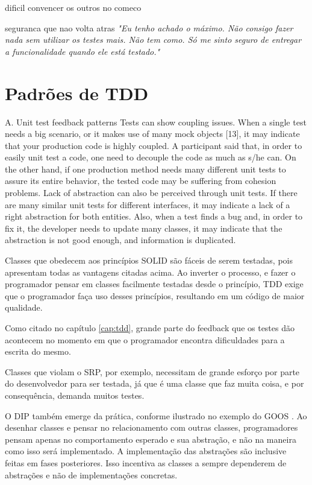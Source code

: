 dificil convencer os outros no comeco

seguranca que nao volta atras
\textit{"Eu tenho achado o máximo. Não consigo fazer nada sem utilizar os testes mais. Não tem como.
Só me sinto seguro de entregar a funcionalidade quando ele está testado."}

\section{Padrões de TDD}
A. Unit test feedback patterns
Tests can show coupling issues. When a single test needs a big scenario, or it makes use of many mock objects [13], it may indicate that your production code is highly coupled. A participant said that, in order to easily unit test a code, one need to decouple the code as much as s/he can.
On the other hand, if one production method needs many different unit tests to assure its entire behavior, the tested code may be suffering from cohesion problems.
Lack of abstraction can also be perceived through unit tests. If there are many similar unit tests for different interfaces, it may indicate a lack of a right abstraction for both entities. Also, when a test finds a bug and, in order to fix it, the developer needs to update many classes, it may indicate that the abstraction is not good enough, and information is duplicated.

Classes que obedecem aos princípios SOLID são fáceis de serem testadas, pois
apresentam todas as vantagens citadas acima. Ao inverter o processo, e fazer o
programador pensar em classes facilmente testadas desde o princípio, TDD exige
que o programador faça uso desses princípios, resultando em um código de maior
qualidade.

Como citado no capítulo \ref{cap:tdd}, grande parte do feedback que os testes
dão acontecem no momento em que o programador encontra dificuldades para a
escrita do mesmo.

Classes que violam o SRP, por exemplo, necessitam de grande
esforço por parte do desenvolvedor para ser testada, já que é uma classe que faz
muita coisa, e por consequência, demanda muitos testes.

O DIP também emerge da prática, conforme ilustrado no exemplo do GOOS
\cite{GOOS}. Ao desenhar classes e pensar no relacionamento com outras classes,
programadores pensam apenas no comportamento esperado e sua abstração, e não na
maneira como isso será implementado. A implementação das abstrações são
inclusive feitas em fases posteriores. Isso incentiva as classes a
sempre dependerem de abstrações e não de implementações concretas.

